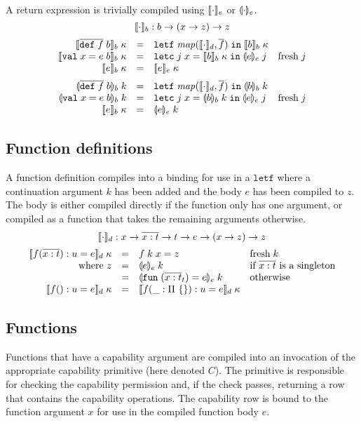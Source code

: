 \documentclass[11pt]{article}
\newcommand{\kw}[1]{\mathtt{#1}}
\begin{document}
A return expression is trivially compiled using $\llbracket \cdot \rrbracket_e$ or $\llparenthesis \cdot \rrparenthesis_e$.
\[
    \llbracket \cdot \rrbracket_b : b -> (x -> z) -> z
\]
\[
\begin{array}{rcll}
\cmpk{b}{\fundef{f}{b}} & = &
  \letff{\map{\cmpn{d}}{\repo{f}}}{\cmpk{b}{b}} \\
\cmpk{b}{\valdef{x}{e}{b}} & = &
  \letc{j}{x}{\cmpk{b}{b}}{\tcmpin{e}{e}{j}} & \fresh{j} \\
\cmpk{b}{\return{e}} & = &
  \cmpk{e}{e} \medskip \\

\tcmpk{b}{\fundef{f}{b}} & = &
  \letff{\map{\cmpn{d}}{\repo{f}}}{\tcmpk{b}{b}} \\
\tcmpk{b}{\valdef{x}{e}{b}} & = &
  \letc{j}{x}{\tcmpk{b}{b}}{\tcmpin{e}{e}{j}} & \fresh{j} \\
\cmpk{b}{\return{e}} & = &
  \tcmpk{e}{e} \\
\end{array}
\]

\subsection*{Function definitions}

A function definition compiles into a binding for use in a $\kw{letf}$ where a continuation argument $k$ has been added and the body $e$ has been compiled to $z$.
The body is either compiled directly if the function only has one argument, or compiled as a function that takes the remaining arguments otherwise.
\[
    \llbracket \cdot \rrbracket_d : x -> \overline{x : t} -> t -> e -> (x -> z) -> z
\]
\[
\begin{array}{rcll}
\cmpk{d}{\fdo{f}{x}{t}{u}{e}} & = &
  \defterm{f}{k}{x}{z} &
  \fresh{k} \\
\text{where $z$} & = &
  \tcmpk{e}{e} & \text{if $\repo{\arge{x}{t}}$ is a singleton} \\
 & = &
  \tcmpk{e}{\fune{\repo{\arge{x}{t}}_t}{e}} & \text{otherwise} \\
\cmpk{d}{\fde{f}{}{u}{e}} & = &
  \cmpk{d}{\fde{f}{\_ : \unitty}{u}{e}}
\end{array}
\]

\subsection*{Functions}

Functions that have a capability argument are compiled into an invocation of the appropriate capability primitive (here denoted $C$).
The primitive is responsible for checking the capability permission and, if the check passes, returning a row that contains the capability operations.
The capability row is bound to the function argument $x$ for use in the compiled function body $e$.
\end{document}
